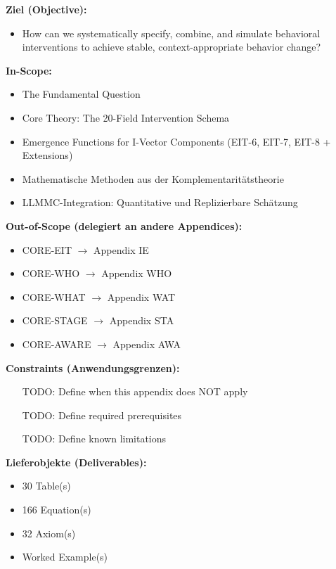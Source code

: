 \begin{tcolorbox}[
    colback=orange!5!white,
    colframe=orange!75!black,
    title={\textbf{Appendix Scope: Ziel / In-Scope / Out-of-Scope / Constraints}},
    fonttitle=\bfseries
]

\textbf{Ziel (Objective):}
\begin{itemize}[nosep]
    \item How can we systematically specify, combine, and simulate behavioral interventions to achieve stable, context-appropriate behavior change?
\end{itemize}

\textbf{In-Scope:}
\begin{itemize}[nosep]
    \item The Fundamental Question
    \item Core Theory: The 20-Field Intervention Schema
    \item Emergence Functions for I-Vector Components (EIT-6, EIT-7, EIT-8 + Extensions)
    \item Mathematische Methoden aus der Komplementaritätstheorie
    \item LLMMC-Integration: Quantitative und Replizierbare Schätzung
\end{itemize}

\textbf{Out-of-Scope (delegiert an andere Appendices):}
\begin{itemize}[nosep]
    \item CORE-EIT $\rightarrow$ Appendix IE
    \item CORE-WHO $\rightarrow$ Appendix WHO
    \item CORE-WHAT $\rightarrow$ Appendix WAT
    \item CORE-STAGE $\rightarrow$ Appendix STA
    \item CORE-AWARE $\rightarrow$ Appendix AWA
\end{itemize}

\textbf{Constraints (Anwendungsgrenzen):}
\begin{itemize}[nosep]
    \item [TODO: Define when this appendix does NOT apply]
    \item [TODO: Define required prerequisites]
    \item [TODO: Define known limitations]
\end{itemize}

\textbf{Lieferobjekte (Deliverables):}
\begin{itemize}[nosep]
    \item 30 Table(s)
    \item 166 Equation(s)
    \item 32 Axiom(s)
    \item Worked Example(s)
\end{itemize}

\end{tcolorbox}


